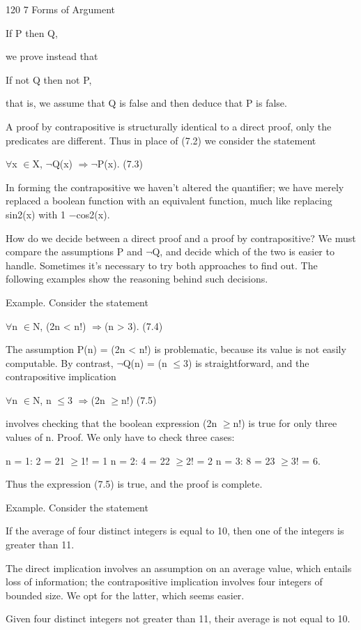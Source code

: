 \documentclass[11pt]{article}
\theoremstyle{plain}
\theoremstyle{definition}
\begin{document}
120 7 Forms of Argument

If P then Q,

we prove instead that

If not Q then not P,

that is, we assume that Q is false and then deduce that P is false.

A proof by contrapositive is structurally identical to a direct proof, only the predicates are different. Thus in place of (7.2) we consider the statement

$\forall$x $\in$X, $\neg$Q(x) $\Rightarrow$$\neg$P(x). (7.3)

In forming the contrapositive we haven't altered the quantifier; we have merely replaced a boolean function with an equivalent function, much like replacing sin2(x) with 1 $-$cos2(x).

How do we decide between a direct proof and a proof by contrapositive? We must compare the assumptions P and $\neg$Q, and decide which of the two is easier to handle. Sometimes it's necessary to try both approaches to find out. The following examples show the reasoning behind such decisions.

Example. Consider the statement

$\forall$n $\in$N, (2n < n!) $\Rightarrow$(n > 3). (7.4)

The assumption P(n) = (2n < n!) is problematic, because its value is not easily computable. By contrast, $\neg$Q(n) = (n $\leq$3) is straightforward, and the contrapositive implication

$\forall$n $\in$N, n $\leq$3 $\Rightarrow$(2n $\geq$n!) (7.5)

involves checking that the boolean expression (2n $\geq$n!) is true for only three values of n. Proof. We only have to check three cases:

n = 1: 2 = 21 $\geq$1! = 1 n = 2: 4 = 22 $\geq$2! = 2 n = 3: 8 = 23 $\geq$3! = 6.

Thus the expression (7.5) is true, and the proof is complete. 

Example. Consider the statement

If the average of four distinct integers is equal to 10, then one of the integers is greater than 11.

The direct implication involves an assumption on an average value, which entails loss of information; the contrapositive implication involves four integers of bounded size. We opt for the latter, which seems easier.

Given four distinct integers not greater than 11, their average is not equal to 10.
\end{document}
